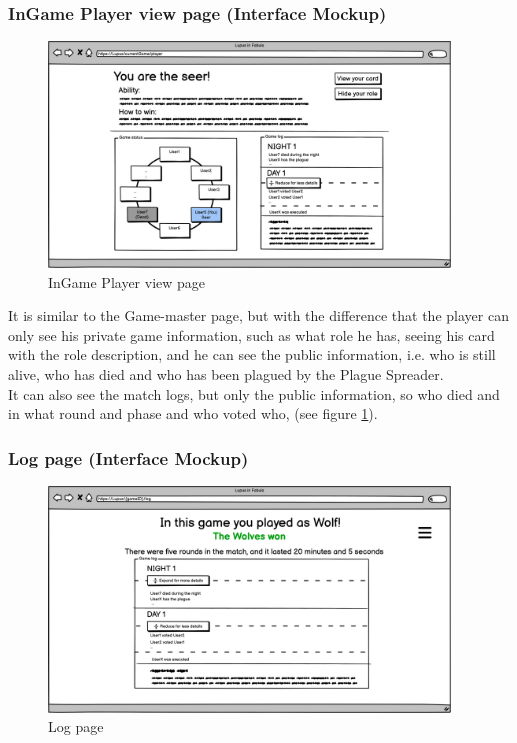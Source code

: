 \subsubsection{InGame Player view page (Interface Mockup)}
\begin{figure}[htb] 
    \centering
    \includegraphics[height=6cm]{images/Page/Game player.png}
    \caption{InGame Player view page}
    \label{fig:GamePlayer_page}
\end{figure}


It is similar to the Game-master page, but with the difference that the player can only see his private game information, such as what role he has, seeing his card with the role description, and he can see the public information, i.e. who is still alive, who has died and who has been plagued by the Plague Spreader.\\
It can also see the match logs, but only the public information, so who died and in what round and phase and who voted who, (see figure \ref{fig:GamePlayer_page}).

\subsubsection{Log page (Interface Mockup)}
\begin{figure}[htb] 
    \centering
    \includegraphics[height=6cm]{images/Page/Log.png}
    \caption{Log page}
    \label{fig:log_page}
\end{figure}

